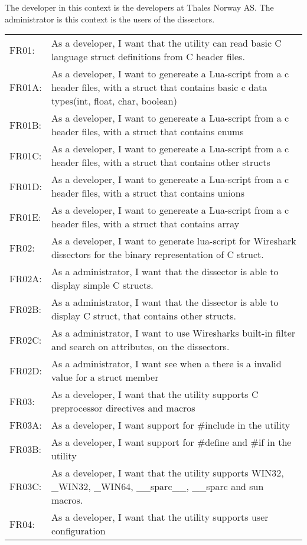 The developer in this context is the developers at Thales Norway AS. \newline
The administrator is this context is the users of the dissectors. \newline
\begin{tabular}{l p{10cm}}
\hline
FR01: 	&As a developer, I want that the utility can read basic C language struct definitions from C header files.\\
FR01A: 	&As a developer, I want to genereate a Lua-script from a c header files, with a struct that contains basic c data types(int, float, char, boolean)\\
FR01B: 	&As a developer, I want to genereate a Lua-script from a c header files, with a struct that contains enums\\
FR01C: 	&As a developer, I want to genereate a Lua-script from a c header files, with a struct that contains other structs\\
FR01D: 	&As a developer, I want to genereate a Lua-script from a c header files, with a struct that contains unions\\
FR01E: 	&As a developer, I want to genereate a Lua-script from a c header files, with a struct that contains array\\
\hline
FR02:		&As a developer, I want to generate lua-script for Wireshark dissectors for the binary representation of C struct.\\
FR02A: 	&As a administrator, I want that the dissector is able to display simple C structs.\\
FR02B: 	&As a administrator, I want that the dissector is able to display C struct, that contains other structs.\\
FR02C: 	&As a administrator, I want to use Wiresharks built-in filter and search on attributes, on the dissectors.\\
FR02D:	&As a administrator, I want see when a there is a invalid value for a struct member\\
\hline
FR03:	&As a developer, I want that the utility supports C preprocessor directives and macros\\
FR03A:	&As a developer, I want support for \#include in the utility\\
FR03B:	&As a developer, I want support for \#define and \#if in the utility\\
FR03C:	&As a developer, I want that the utility supports WIN32, \_WIN32, \_WIN64, \_\_sparc\_\_, \_\_sparc and sun macros.\\
\hline
FR04: 	&As a developer, I want that the utility supports user configuration\\

\end{tabular}
